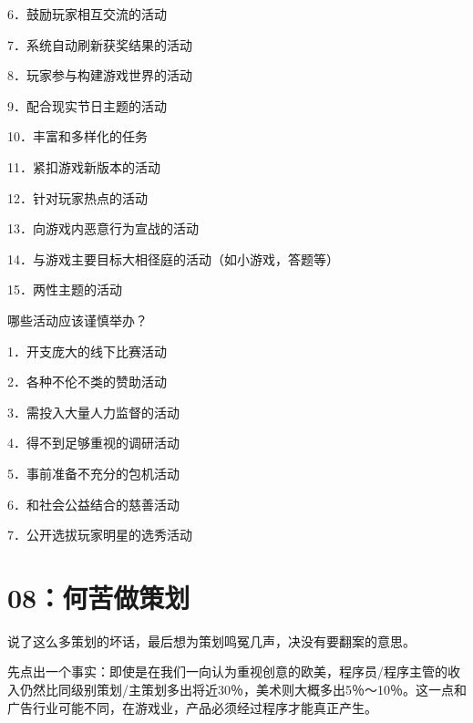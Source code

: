 \documentclass{article}
\begin{document}
6．鼓励玩家相互交流的活动



7．系统自动刷新获奖结果的活动



8．玩家参与构建游戏世界的活动



9．配合现实节日主题的活动



10．丰富和多样化的任务



11．紧扣游戏新版本的活动



12．针对玩家热点的活动



13．向游戏内恶意行为宣战的活动



14．与游戏主要目标大相径庭的活动（如小游戏，答题等）



15．两性主题的活动



哪些活动应该谨慎举办？



1．开支庞大的线下比赛活动



2．各种不伦不类的赞助活动



3．需投入大量人力监督的活动



4．得不到足够重视的调研活动



5．事前准备不充分的包机活动



6．和社会公益结合的慈善活动



7．公开选拔玩家明星的选秀活动





{\centering\section*{08：何苦做策划}}





说了这么多策划的坏话，最后想为策划鸣冤几声，决没有要翻案的意思。



先点出一个事实：即使是在我们一向认为重视创意的欧美，程序员/程序主管的收入仍然比同级别策划/主策划多出将近30％，美术则大概多出5％～10％。这一点和广告行业可能不同，在游戏业，产品必须经过程序才能真正产生。
\end{document}
